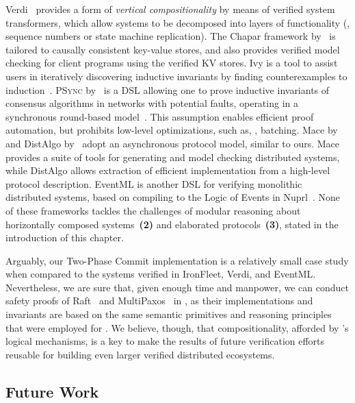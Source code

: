 Verdi~\cite{Wilcox-al:PLDI15, Woos-al:CPP16} provides a form of
\emph{vertical compositionality} by means of verified system
transformers, which allow systems to be decomposed into layers of
functionality (\eg, sequence numbers or state machine replication).
%
The Chapar framework by~\citet{Lesani-al:POPL16} is tailored to
causally consistent key-value stores, and also provides verified model
checking for client programs using the verified KV stores.
%
Ivy is a tool to assist users in iteratively discovering inductive
invariants by finding counterexamples to
induction~\cite{Padon-al:PLDI16}.
%
\textsc{PSync} by~\citet{Dragoi-al:POPL16} is a DSL allowing one to
prove inductive invariants of consensus algorithms in networks with
potential faults, operating in a synchronous round-based
model~\cite{Elrad-Frances:SCP82}. This assumption enables efficient
proof automation, but prohibits low-level optimizations, such as, \eg,
batching.
%
Mace by~\citet{Killian-al:PLDI07} and DistAlgo
by~\citet{Liu-al:OOPSLA12} adopt an asynchronous protocol model,
similar to ours.
%
Mace provides a suite of tools for generating and model checking
distributed systems, while DistAlgo allows extraction of efficient
implementation from a high-level protocol description.
%
EventML is another DSL for verifying monolithic distributed systems,
based on compiling to the Logic of Events in
Nuprl~\cite{rahli:eventml-avocs}.
%
None of these frameworks tackles the challenges of modular reasoning
about horizontally composed systems~\textbf{(2)} and elaborated
protocols~\textbf{(3)}, stated in the introduction of this chapter.

Arguably, our Two-Phase Commit implementation is a relatively small
case study when compared to the systems verified in IronFleet, Verdi,
and EventML. Nevertheless, we are sure that, given enough time and
manpower, we can conduct safety proofs of
Raft~\cite{Ongaro-Ousterhout:UATC14} and
MultiPaxos~\cite{vanRenesse-Altinbuken:ACS15} in \disel, as their
implementations and invariants are based on the same semantic
primitives and reasoning principles that were employed for .
%
We believe, though, that compositionality, afforded by \disel's
logical mechanisms, is a key to make the results of future
verification efforts reusable for building even larger verified
distributed ecosystems.

\subsection{Future Work}

